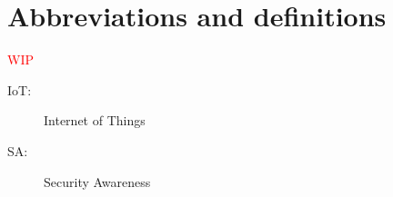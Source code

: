 \chapter*{Abbreviations and definitions}
\textcolor{red}{WIP}

\begin{description}
    \item[IoT: ] Internet of Things 
    \item[SA: ] Security Awareness
\end{description}
